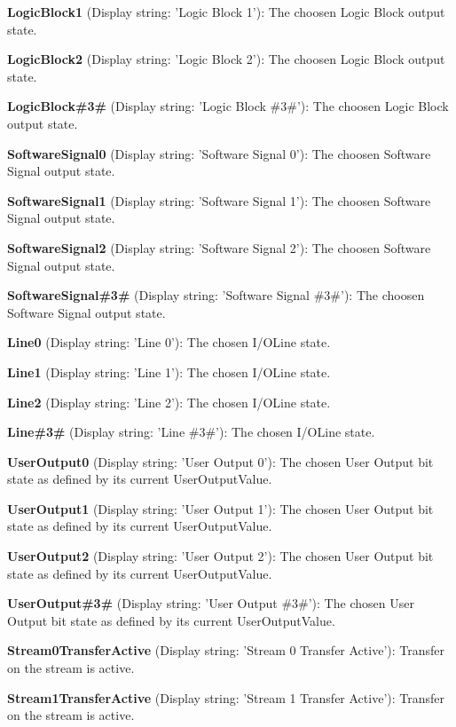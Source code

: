 \begin{DoxyItemize}
\item {\bfseries Logic\+Block1} (Display string\+: 'Logic Block 1')\+: The choosen Logic Block output state.
\item {\bfseries Logic\+Block2} (Display string\+: 'Logic Block 2')\+: The choosen Logic Block output state.
\item {\bfseries Logic\+Block\#3\#} (Display string\+: 'Logic Block \#3\#')\+: The choosen Logic Block output state.
\item {\bfseries Software\+Signal0} (Display string\+: 'Software Signal 0')\+: The choosen Software Signal output state.
\item {\bfseries Software\+Signal1} (Display string\+: 'Software Signal 1')\+: The choosen Software Signal output state.
\item {\bfseries Software\+Signal2} (Display string\+: 'Software Signal 2')\+: The choosen Software Signal output state.
\item {\bfseries Software\+Signal\#3\#} (Display string\+: 'Software Signal \#3\#')\+: The choosen Software Signal output state.
\item {\bfseries Line0} (Display string\+: 'Line 0')\+: The chosen I/\+O\+Line state.
\item {\bfseries Line1} (Display string\+: 'Line 1')\+: The chosen I/\+O\+Line state.
\item {\bfseries Line2} (Display string\+: 'Line 2')\+: The chosen I/\+O\+Line state.
\item {\bfseries Line\#3\#} (Display string\+: 'Line \#3\#')\+: The chosen I/\+O\+Line state.
\item {\bfseries User\+Output0} (Display string\+: 'User Output 0')\+: The chosen User Output bit state as defined by its current User\+Output\+Value.
\item {\bfseries User\+Output1} (Display string\+: 'User Output 1')\+: The chosen User Output bit state as defined by its current User\+Output\+Value.
\item {\bfseries User\+Output2} (Display string\+: 'User Output 2')\+: The chosen User Output bit state as defined by its current User\+Output\+Value.
\item {\bfseries User\+Output\#3\#} (Display string\+: 'User Output \#3\#')\+: The chosen User Output bit state as defined by its current User\+Output\+Value.
\item {\bfseries Stream0\+Transfer\+Active} (Display string\+: 'Stream 0 Transfer Active')\+: Transfer on the stream is active.
\item {\bfseries Stream1\+Transfer\+Active} (Display string\+: 'Stream 1 Transfer Active')\+: Transfer on the stream is active.

\end{DoxyItemize}
